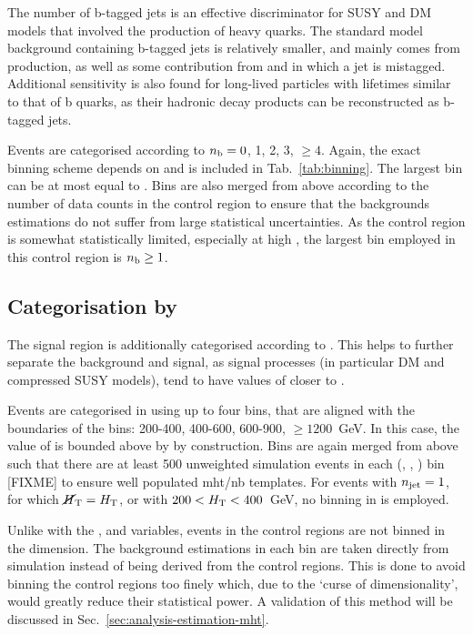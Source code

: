 The number of b-tagged jets is an effective discriminator for SUSY and DM 
models that involved the production of heavy quarks. The standard model 
background containing b-tagged jets is relatively smaller, and mainly comes 
from \ttbar production, as well as some contribution from \wj and \zj in which 
a jet is mistagged. Additional sensitivity is also found for long-lived 
particles with lifetimes similar to that of b quarks, as their hadronic decay 
products can be reconstructed as b-tagged jets.

Events are categorised according to $n_{\text{b}} = 0$, 1, 2, 3, $\geq4$.
Again, the exact binning scheme depends on \njet and is included in 
Tab.~\ref{tab:binning}.
The largest \nb bin can be at most equal to \njet. Bins are also merged from 
above according to the number of data counts in the \mj control region to 
ensure that the backgrounds estimations do not suffer from large statistical 
uncertainties.
As the \mmj control region is somewhat statistically limited, especially at 
high \nb, the largest \nb bin employed in this control region is $n_{\text{b}} \geq 1$.

\subsection*{Categorisation by \mht}

The signal region is additionally categorised according to \mht. This helps to 
further separate the background and signal, as signal processes (in particular 
DM and compressed SUSY models), tend to have values of \mht closer to \scalht.

Events are categorised in \mht using up to four bins, that are aligned with the 
boundaries of the \scalht bins: 200-400, 400-600, 600-900, $\geq1200$~GeV. In 
this case, the value of \mht is bounded above by \scalht by construction. Bins 
are again merged from above such that there are at least 500 unweighted 
simulation events in each (\njet, \scalht, \mht) bin [FIXME] to ensure well 
populated mht/nb templates. For events with $n_{\text{jet}}=1$, for which 
$\mbox{$\cancel{H}_\text{T}$}=\mbox{$H_\text{T}$}$, or with $200<\mbox{$H_\text{T}$}<400$~GeV, no binning in \mht is employed.

Unlike with the \njet, \nb and \scalht variables, events in the control regions 
are not binned in the \mht dimension. The background estimations in each \mht 
bin are taken directly from simulation instead of being derived from the 
control regions. This is done to avoid binning the control regions too finely 
which, due to the `curse of dimensionality', would greatly reduce their 
statistical power. A validation of this method will be discussed in 
Sec.~\ref{sec:analysis-estimation-mht}.

